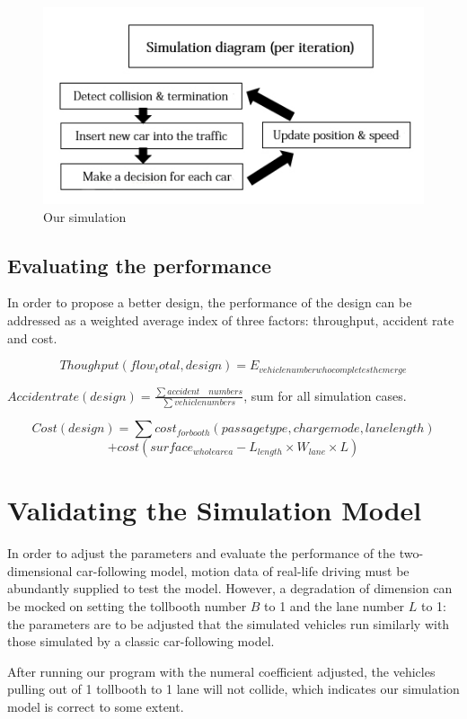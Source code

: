\documentclass{mcmthesis}
\begin{document}
\begin{figure}[H]
	\small 
	\centering
	\caption{Our simulation}
	\includegraphics{simulation.jpg}
\end{figure}

\subsection{Evaluating the performance}

In order to propose a better design, the performance of the design can be addressed as a weighted average index of three factors: throughput, accident rate and cost. 

$$Thoughput(flow_total, design) = E_{vehicle number who completes the merge}$$

$Accident rate(design)= \frac{\sum accident \quad numbers}{\sum vehicle numbers}$, sum for all simulation cases.

$$Cost(design)=\sum cost_{for booth}(passage type,charge mode,lane length)$$
$$+cost(surface_{whole area} - L_{length} \times W_{lane} \times L) $$


\section{Validating the Simulation Model}

In order to adjust the parameters and evaluate the performance of the two-dimensional car-following model, motion data of real-life driving must be abundantly supplied to test the model. However, a degradation of dimension can be mocked on setting the tollbooth number $B$ to 1 and the lane number $L$ to 1: the parameters are to be adjusted that the simulated vehicles run similarly with those simulated by a classic car-following model.

After running our program with the numeral coefficient adjusted, the vehicles pulling out of 1 tollbooth to 1 lane will not collide, which indicates our simulation model is correct to some extent.
\end{document}
